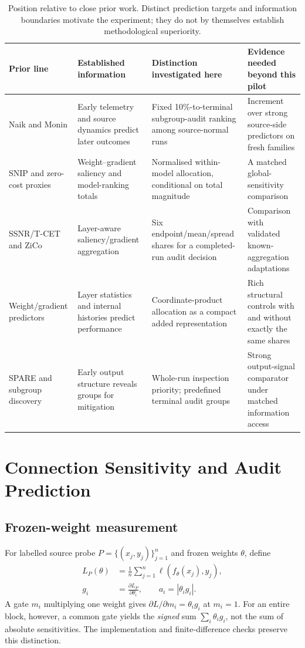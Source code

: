 \documentclass[nolineno]{ieeeaccess}
\begin{document}
\begin{table}[t]
\caption{Position relative to close prior work. Distinct prediction targets and information boundaries motivate the experiment; they do not by themselves establish methodological superiority.}
\label{tab:position}
\centering\small
\begin{tabularx}{\textwidth}{>{\raggedright\arraybackslash}p{2.5cm}YYY}
\toprule Prior line & Established information & Distinction investigated here & Evidence needed beyond this pilot\\\midrule
Naik and Monin & Early telemetry and source dynamics predict later outcomes & Fixed 10\%-to-terminal subgroup-audit ranking among source-normal runs & Increment over strong source-side predictors on fresh families\\
SNIP and zero-cost proxies & Weight--gradient saliency and model-ranking totals & Normalised within-model allocation, conditional on total magnitude & A matched global-sensitivity comparison\\
SSNR/T-CET and ZiCo & Layer-aware saliency/gradient aggregation & Six endpoint/mean/spread shares for a completed-run audit decision & Comparison with validated known-aggregation adaptations\\
Weight/gradient predictors & Layer statistics and internal histories predict performance & Coordinate-product allocation as a compact added representation & Rich structural controls with and without exactly the same shares\\
SPARE and subgroup discovery & Early output structure reveals groups for mitigation & Whole-run inspection priority; predefined terminal audit groups & Strong output-signal comparator under matched information access\\\bottomrule
\end{tabularx}
\end{table}

\section{Connection Sensitivity and Audit Prediction}
\label{sec:method}
\subsection{Frozen-weight measurement}
For labelled source probe $P=\{(x_j,y_j)\}_{j=1}^{n}$ and frozen weights $\theta$, define
\begin{equation}
\begin{aligned}
L_P(\theta)&=\frac1n\sum_{j=1}^{n}\ell(f_\theta(x_j),y_j),\\
g_i&=\frac{\partial L_P}{\partial\theta_i},\qquad a_i=|\theta_i g_i|.
\end{aligned}
\label{eq:sensitivity}
\end{equation}
A gate $m_i$ multiplying one weight gives $\partial L/\partial m_i=\theta_i g_i$ at $m_i=1$. For an entire block, however, a common gate yields the \emph{signed} sum $\sum_i\theta_i g_i$, not the sum of absolute sensitivities. The implementation and finite-difference checks preserve this distinction.
\end{document}
